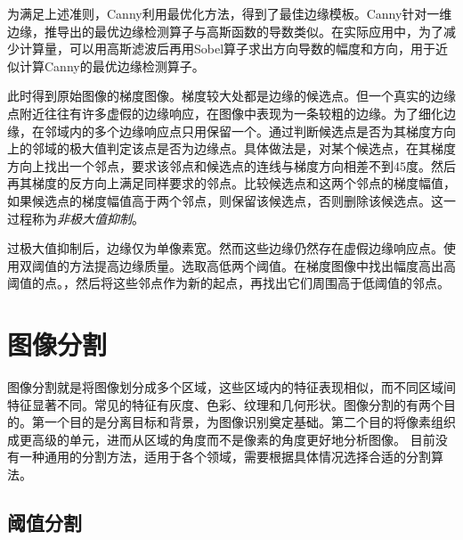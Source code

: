 为满足上述准则，Canny利用最优化方法，得到了最佳边缘模板。Canny针对一维边缘，推导出的最优边缘检测算子与高斯函数的导数类似。在实际应用中，为了减少计算量，可以用高斯滤波后再用Sobel算子求出方向导数的幅度和方向，用于近似计算Canny的最优边缘检测算子。

此时得到原始图像的梯度图像。梯度较大处都是边缘的候选点。但一个真实的边缘点附近往往有许多虚假的边缘响应，在图像中表现为一条较粗的边缘。为了细化边缘，在邻域内的多个边缘响应点只用保留一个。通过判断候选点是否为其梯度方向上的邻域的极大值判定该点是否为边缘点。具体做法是，对某个候选点，在其梯度方向上找出一个邻点，要求该邻点和候选点的连线与梯度方向相差不到45度。然后再其梯度的反方向上满足同样要求的邻点。比较候选点和这两个邻点的梯度幅值，如果候选点的梯度幅值高于两个邻点，则保留该候选点，否则删除该候选点。这一过程称为\emph{非极大值抑制}。

过极大值抑制后，边缘仅为单像素宽。然而这些边缘仍然存在虚假边缘响应点。使用双阈值的方法提高边缘质量。选取高低两个阈值。在梯度图像中找出幅度高出高阈值的点。，然后将这些邻点作为新的起点，再找出它们周围高于低阈值的邻点。

\section{图像分割}

图像分割就是将图像划分成多个区域，这些区域内的特征表现相似，而不同区域间特征显著不同。常见的特征有灰度、色彩、纹理和几何形状。图像分割的有两个目的。第一个目的是分离目标和背景，为图像识别奠定基础。第二个目的将像素组织成更高级的单元，进而从区域的角度而不是像素的角度更好地分析图像。
目前没有一种通用的分割方法，适用于各个领域，需要根据具体情况选择合适的分割算法。

\subsection{阈值分割}

